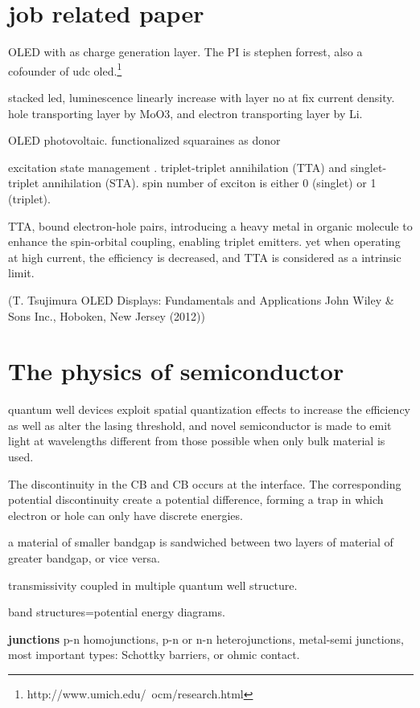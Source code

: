 \section{job related paper}

OLED with  as charge generation layer. \cite{Kanno2006} The PI is stephen forrest, also a cofounder of udc oled.\footnote{http://www.umich.edu/~ocm/research.html}

stacked led, luminescence linearly increase with layer no at fix current density. hole transporting layer by MoO3, and electron transporting layer by Li.

OLED photovoltaic.\cite{Xiao2012a} functionalized squaraines as donor

excitation state management \cite{Zhang2012b}.
triplet-triplet annihilation (TTA) and singlet-triplet annihilation (STA). spin number of exciton is either 0 (singlet) or 1 (triplet).

TTA, bound electron-hole pairs, introducing a heavy metal in organic molecule to enhance the spin-orbital coupling, enabling triplet emitters.\cite{Zhang2013i} yet when operating at high current, the efficiency is decreased, and TTA is considered as a intrinsic limit.


(T. Tsujimura OLED Displays: Fundamentals and Applications John Wiley \& Sons Inc., Hoboken, New Jersey (2012))

\section{The physics of semiconductor}

quantum well devices exploit spatial quantization effects to increase the efficiency as well as alter the lasing threshold, and  novel semiconductor is made to emit light at wavelengths different from those possible when only bulk material is used.


The discontinuity in the CB and CB occurs at the interface. The corresponding potential discontinuity create a potential difference, forming a trap in which electron or hole can only have discrete energies.

a material of smaller bandgap is sandwiched between two layers of material of greater bandgap, or vice versa.

transmissivity coupled in multiple quantum well structure.

band structures=potential energy diagrams.

\textbf{junctions}
p-n homojunctions, p-n or n-n heterojunctions, metal-semi junctions, most important types: Schottky barriers, or ohmic contact.

